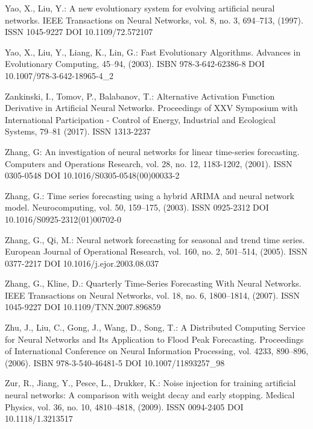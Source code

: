 \begin{thebibliography}{99.}
 Yao, X., Liu, Y.: A new evolutionary system for evolving artificial neural networks. IEEE Transactions on Neural Networks, vol. 8, no. 3, 694--713, (1997). ISSN 1045-9227 DOI 10.1109/72.572107

 Yao, X., Liu, Y., Liang, K., Lin, G.: Fast Evolutionary Algorithms. Advances in Evolutionary Computing, 45--94, (2003). ISBN 978-3-642-62386-8 DOI 10.1007/978-3-642-18965-4\_2

 Zankinski, I., Tomov, P., Balabanov, T.: Alternative Activation Function Derivative in Artificial Neural Networks. Proceedings of XXV Symposium with International Participation - Control of Energy, Industrial and Ecological Systems, 79--81 (2017). ISSN 1313-2237

 Zhang, G: An investigation of neural networks for linear time-series forecasting. Computers and Operations Research, vol. 28, no. 12, 1183-1202, (2001). ISSN 0305-0548 DOI 10.1016/S0305-0548(00)00033-2

 Zhang, G.: Time series forecasting using a hybrid ARIMA and neural network model. Neurocomputing, vol. 50, 159--175, (2003). ISSN 0925-2312 DOI 10.1016/S0925-2312(01)00702-0

 Zhang, G., Qi, M.: Neural network forecasting for seasonal and trend time series. European Journal of Operational Research, vol. 160, no. 2, 501--514, (2005). ISSN 0377-2217 DOI 10.1016/j.ejor.2003.08.037

 Zhang, G., Kline, D.: Quarterly Time-Series Forecasting With Neural Networks. IEEE Transactions on Neural Networks, vol. 18, no. 6, 1800--1814, (2007). ISSN 1045-9227 DOI 10.1109/TNN.2007.896859

 Zhu, J., Liu, C., Gong, J., Wang, D., Song, T.: A Distributed Computing Service for Neural Networks and Its Application to Flood Peak Forecasting. Proceedings of International Conference on Neural Information Processing, vol. 4233, 890--896, (2006). ISBN 978-3-540-46481-5 DOI 10.1007/11893257\_98

 Zur, R., Jiang, Y., Pesce, L., Drukker, K.: Noise injection for training artificial neural networks: A comparison with weight decay and early stopping. Medical Physics, vol. 36, no. 10, 4810--4818, (2009). ISSN 0094-2405 DOI 10.1118/1.3213517

\end{thebibliography}
